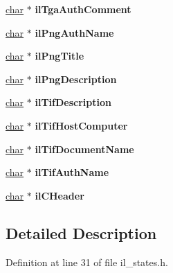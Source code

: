 \begin{DoxyCompactItemize}
\item 
\mbox{\label{structIL__STATES_ae9a68d609d3a361db0f8c3f579cc67f0}} 
\hyperlink{classchar}{char} $\ast$ {\bfseries il\+Tga\+Auth\+Comment}
\item 
\mbox{\label{structIL__STATES_ac46acd9da3ef83f7b012d864675e26a0}} 
\hyperlink{classchar}{char} $\ast$ {\bfseries il\+Png\+Auth\+Name}
\item 
\mbox{\label{structIL__STATES_a859deb12e682aed9600e4d1dcefbeaab}} 
\hyperlink{classchar}{char} $\ast$ {\bfseries il\+Png\+Title}
\item 
\mbox{\label{structIL__STATES_a8f4f1b15f2fcbc0992e681e56ddfd128}} 
\hyperlink{classchar}{char} $\ast$ {\bfseries il\+Png\+Description}
\item 
\mbox{\label{structIL__STATES_ae0f10051434e9d820e38d1b4d9959724}} 
\hyperlink{classchar}{char} $\ast$ {\bfseries il\+Tif\+Description}
\item 
\mbox{\label{structIL__STATES_a5214e37038d71a90249205f4a81603f8}} 
\hyperlink{classchar}{char} $\ast$ {\bfseries il\+Tif\+Host\+Computer}
\item 
\mbox{\label{structIL__STATES_a1a1c5ad1a0f4346b5839e8e60265856c}} 
\hyperlink{classchar}{char} $\ast$ {\bfseries il\+Tif\+Document\+Name}
\item 
\mbox{\label{structIL__STATES_a49a58a72dc6536a5cb3d020458640a4e}} 
\hyperlink{classchar}{char} $\ast$ {\bfseries il\+Tif\+Auth\+Name}
\item 
\mbox{\label{structIL__STATES_af5b46624cef2ec8b94825b660a9f24ea}} 
\hyperlink{classchar}{char} $\ast$ {\bfseries il\+C\+Header}
\end{DoxyCompactItemize}


\subsection{Detailed Description}


Definition at line 31 of file il\+\_\+states.\+h.



